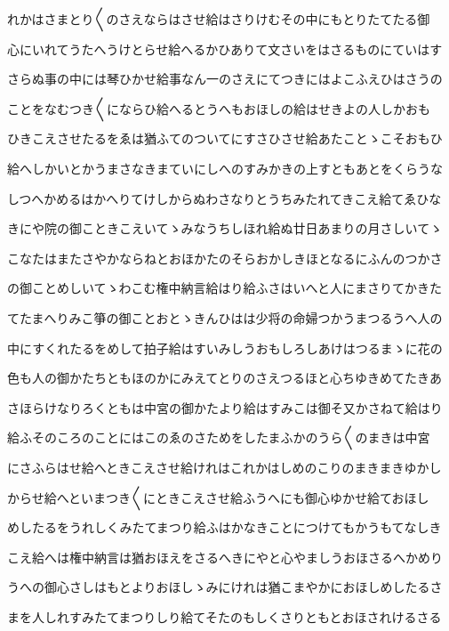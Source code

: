 \documentclass[a4paper,11pt,landscape]{ltjtarticle}
\begin{document}
\par\medskip
れかはさまとり〱のさえならはさせ給はさりけむその中にもとりたてたる御
\par\medskip
心にいれてうたへうけとらせ給へるかひありて文さいをはさるものにていはす
\par\medskip
さらぬ事の中には琴ひかせ給事なん一のさえにてつきにはよこふえひはさうの
\par\medskip
ことをなむつき〱にならひ給へるとうへもおほしの給はせきよの人しかおも
\par\medskip
ひきこえさせたるをゑは猶ふてのついてにすさひさせ給あたことゝこそおもひ
\par\medskip
給へしかいとかうまさなきまていにしへのすみかきの上すともあとをくらうな
\par\medskip
しつへかめるはかへりてけしからぬわさなりとうちみたれてきこえ給てゑひな
\par\medskip
きにや院の御こときこえいてゝみなうちしほれ給ぬ廿日あまりの月さしいてゝ
\par\medskip
こなたはまたさやかならねとおほかたのそらおかしきほとなるにふんのつかさ
\par\medskip
の御ことめしいてゝわこむ権中納言給はり給ふさはいへと人にまさりてかきた
\par\medskip
てたまへりみこ箏の御ことおとゝきんひはは少将の命婦つかうまつるうへ人の
\par\medskip
中にすくれたるをめして拍子給はすいみしうおもしろしあけはつるまゝに花の
\par\medskip
色も人の御かたちともほのかにみえてとりのさえつるほと心ちゆきめてたきあ
\par\medskip
さほらけなりろくともは中宮の御かたより給はすみこは御そ又かさねて給はり
\par\medskip
給ふそのころのことにはこのゑのさためをしたまふかのうら〱のまきは中宮
\par\medskip
にさふらはせ給へときこえさせ給けれはこれかはしめのこりのまきまきゆかし
\par\medskip
からせ給へといまつき〱にときこえさせ給ふうへにも御心ゆかせ給ておほし
\par\medskip
めしたるをうれしくみたてまつり給ふはかなきことにつけてもかうもてなしき
\par\medskip
こえ給へは権中納言は猶おほえをさるへきにやと心やましうおほさるへかめり
\par\medskip
うへの御心さしはもとよりおほしゝみにけれは猶こまやかにおほしめしたるさ
\par\medskip
まを人しれすみたてまつりしり給てそたのもしくさりともとおほされけるさる
\par\medskip
\end{document}
